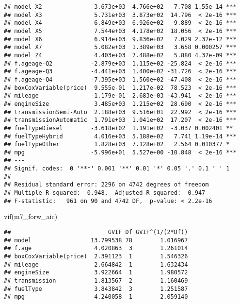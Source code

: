 \documentclass[
]{article}
\newenvironment{Shaded}{\begin{snugshade}}{\end{snugshade}}
\newcommand{\FunctionTok}[1]{\textcolor[rgb]{0.00,0.00,0.00}{#1}}
\newcommand{\NormalTok}[1]{#1}
\begin{document}
\begin{verbatim}
## model X2               3.673e+03  4.766e+02   7.708 1.55e-14 ***
## model X3               5.731e+03  3.873e+02  14.796  < 2e-16 ***
## model X4               6.849e+03  6.926e+02   9.889  < 2e-16 ***
## model X5               7.544e+03  4.178e+02  18.056  < 2e-16 ***
## model X6               6.914e+03  9.836e+02   7.029 2.37e-12 ***
## model X7               5.082e+03  1.389e+03   3.658 0.000257 ***
## model Z4               4.403e+03  7.488e+02   5.880 4.37e-09 ***
## f.ageage-Q2           -2.879e+03  1.115e+02 -25.824  < 2e-16 ***
## f.ageage-Q3           -4.441e+03  1.400e+02 -31.726  < 2e-16 ***
## f.ageage-Q4           -7.395e+03  1.560e+02 -47.408  < 2e-16 ***
## boxCoxVariable(price)  9.555e-01  1.217e-02  78.523  < 2e-16 ***
## mileage               -1.179e-01  2.683e-03 -43.941  < 2e-16 ***
## engineSize             3.485e+03  1.215e+02  28.690  < 2e-16 ***
## transmissionSemi-Auto  2.188e+03  9.516e+01  22.992  < 2e-16 ***
## transmissionAutomatic  1.791e+03  1.041e+02  17.207  < 2e-16 ***
## fuelTypeDiesel        -3.618e+02  1.191e+02  -3.037 0.002401 ** 
## fuelTypeHybrid         4.016e+03  5.188e+02   7.741 1.19e-14 ***
## fuelTypeOther          1.828e+03  7.128e+02   2.564 0.010377 *  
## mpg                   -5.996e+01  5.527e+00 -10.848  < 2e-16 ***
## ---
## Signif. codes:  0 '***' 0.001 '**' 0.01 '*' 0.05 '.' 0.1 ' ' 1
## 
## Residual standard error: 2296 on 4742 degrees of freedom
## Multiple R-squared:  0.948,  Adjusted R-squared:  0.947 
## F-statistic:   961 on 90 and 4742 DF,  p-value: < 2.2e-16
\end{verbatim}

\begin{Shaded}
\begin{Highlighting}[]
\FunctionTok{vif}\NormalTok{(m7\_forw\_aic)}
\end{Highlighting}
\end{Shaded}

\begin{verbatim}
##                            GVIF Df GVIF^(1/(2*Df))
## model                 13.799538 78        1.016967
## f.age                  4.020863  3        1.261014
## boxCoxVariable(price)  2.391123  1        1.546326
## mileage                2.664842  1        1.632434
## engineSize             3.922664  1        1.980572
## transmission           1.813567  2        1.160469
## fuelType               3.843842  3        1.251587
## mpg                    4.240058  1        2.059140
\end{verbatim}
\end{document}
